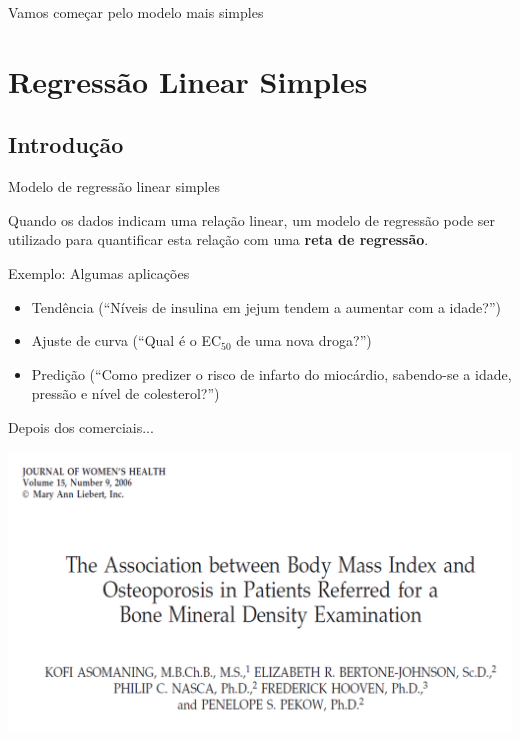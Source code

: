 \documentclass{beamer}
\begin{document}
\begin{frame}
  \begin{center}
    \Large Vamos começar pelo modelo mais simples
  \end{center}
\end{frame}

\section[Regressão]{Regressão Linear Simples}

\subsection{Introdução}

\begin{frame}{Modelo de regressão linear simples}
  \begin{block}{}
    \small
      Quando os dados indicam uma relação linear, um modelo de regressão pode ser utilizado para quantificar esta relação com uma {\bf reta de regressão}.
    \end{block}
  \begin{exampleblock}{Exemplo: Algumas aplicações}

    \begin{itemize}
      \footnotesize
    \item Tendência (``Níveis de insulina em jejum tendem a aumentar com a idade?'')
    \item Ajuste de curva (``Qual é o EC$_{50}$ de uma nova droga?'')
    \item Predição (``Como predizer o risco de infarto do miocárdio, sabendo-se a idade, pressão e nível de colesterol?'')
    \end{itemize}
  \end{exampleblock}
\end{frame}

\begin{frame}{Depois dos comerciais...}
  \begin{center}
    \includegraphics[width=\textwidth]{Cap18-19/bmi-bmd-title}
  \end{center}
\end{frame}
\end{document}
